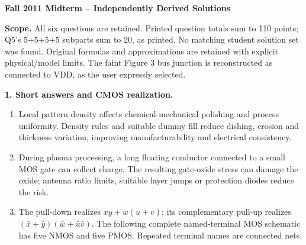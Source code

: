 \documentclass[10pt]{article}
\newcommand{\mos}[4]{\begin{scope}[shift={(#1,#2)}]
\draw (0,.24)--(0,-.24);\draw (0,.20)--(.25,.20)--(.25,.5);
\draw (0,-.20)--(.25,-.20)--(.25,-.5);\draw (-.16,.23)--(-.16,-.23);
\ifnum#4=1\draw (-.26,0) circle (.06);\draw (-.75,0)--(-.32,0);\else\draw (-.75,0)--(-.16,0);\fi
\node[anchor=east,font=\scriptsize] at (-.76,0) {$#3$};\end{scope}}
\begin{document}
\begin{center}{\large\bfseries Fall 2011 Midterm -- Independently Derived Solutions}\end{center}
\textbf{Scope.} All six questions are retained. Printed question totals sum to 110 points; Q5's 5+5+5+5 subparts sum to 20, as printed. No matching student solution set was found. Original formulas and approximations are retained with explicit physical/model limits. The faint Figure 3 bus junction is reconstructed as connected to VDD, as the user expressly selected.

\textbf{1. Short answers and CMOS realization.}
\begin{enumerate}[label=(\alph*),leftmargin=7mm,itemsep=4pt]
\item Local pattern density affects chemical-mechanical polishing and process uniformity. Density rules and suitable dummy fill reduce dishing, erosion and thickness variation, improving manufacturability and electrical consistency.
\item During plasma processing, a long floating conductor connected to a small MOS gate can collect charge. The resulting gate-oxide stress can damage the oxide; antenna ratio limits, suitable layer jumps or protection diodes reduce the risk.
\item The pull-down realizes $xy+w(u+v)$; its complementary pull-up realizes $(\bar x+\bar y)(\bar w+\bar u\bar v)$. The following complete named-terminal MOS schematic has five NMOS and five PMOS. Repeated terminal names are connected nets.
\begin{center}
\end{center}
\end{enumerate}
\end{document}
